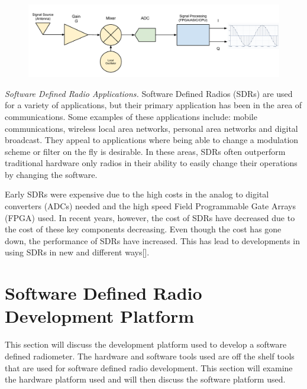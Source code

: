 {\begin{figure}[h!tb] 
\centering
\includegraphics[width=\textwidth]{Images/SDR_Prac_block.pdf}
\label{prac_sdr}
\end{figure}
}

\emph{Software Defined Radio Applications.}  Software Defined Radios (SDRs) are used for a variety of applications, but their primary application has been in the area of communications.  Some examples of these applications include:  mobile communications, wireless local area networks, personal area networks and digital broadcast.  They appeal to applications where being able to change a modulation scheme or filter on the fly is desirable.  In these areas, SDRs often outperform traditional hardware only radios in their ability to easily change their operations by changing the software.  

Early SDRs were expensive due to the high costs in the analog to digital converters (ADCs) needed and the high speed Field Programmable Gate Arrays (FPGA) used.  In recent years, however, the cost of SDRs have decreased due to the cost of these key components decreasing.  Even though the cost has gone down, the performance of SDRs have increased.  This has lead to developments in using SDRs in new and different ways[\cite{jondral2005software}].



\section{Software Defined Radio Development Platform} \label{SDR_platform}
This section will discuss the development platform used to develop a software defined radiometer.  The hardware and software tools used are off the shelf tools that are used for software defined radio development.  This section will examine the hardware platform used and will then discuss the software platform used.  

